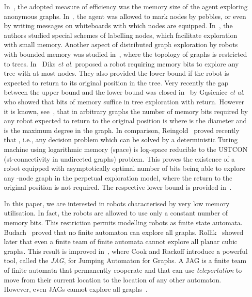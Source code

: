 \documentclass[11pt,envcountsame,oribibl]{llncs}
\begin{document}
In~\cite{CohFraIlcKorPel05,DiFKP02,FraIl04,FraIPPP04,FraIlcRajTix06},
the adopted measure of
efficiency was the memory size of the agent exploring anonymous
graphs. In~\cite{FraIl04,FraIlcRajTix06}, the agent was allowed to mark nodes by
pebbles, or even by writing messages on whiteboards with which nodes
are equipped. In~\cite{CohFraIlcKorPel05}, the authors studied special schemes
of labelling nodes, which facilitate exploration with small memory.
Another aspect of distributed graph exploration by robots with
bounded memory was studied in~\cite{DiFKP02,GPRZ07}, where the topology
of graphs is restricted to trees. In~\cite{DiFKP02} Diks {\em et al.}
proposed a robot requiring  memory bits to explore any
tree with at most  nodes. They also provided the lower bound
 if the robot is expected to return to its original
position in the tree. Very recently the gap between the upper bound
and the lower bound was closed in~\cite{GPRZ07} by G\k asieniec {\em
et al.} who showed that  bits of memory suffice in tree
exploration with return. However it is known, see~\cite{FraIPPP04}, that in
arbitrary graphs the number of memory bits required by any robot
expected to return to the original position is 
where  is the diameter and  is the maximum degree in the
graph. In comparison, Reingold~\cite{Rein} proved recently that , i.e., any decision problem which can be solved by a
deterministic Turing machine using logarithmic memory (space) is
log-space reducible to the USTCON (st-connectivity in undirected
graphs) problem. This proves the existence of a robot equipped with
asymptotically optimal number of  bits being able to
explore any -node graph in the perpetual exploration model, where
the return to the original position is not required. The respective
lower bound  is provided in~\cite{Rol80}.

In this paper, we are interested in robots characterised by very low
memory utilisation. In fact, the robots are allowed to use only a
constant number of memory bits. This restriction permits modelling
robots as finite state automata. Budach~\cite{Bu78} proved that no
finite automaton can explore all graphs. Rollik~\cite{Rol80} showed
later that even a finite team of finite automata cannot explore all
planar cubic graphs. This result is improved in~\cite{CooRac80}, where
Cook and Rackoff introduce a powerful tool, called the {\em JAG},
for Jumping Automaton for Graphs. A JAG is a finite team of finite
automata that permanently cooperate and that can use {\em
teleportation} to move from their current location to the location
of any other automaton. However, even JAGs cannot explore all
graphs~\cite{CooRac80}.
\end{document}
